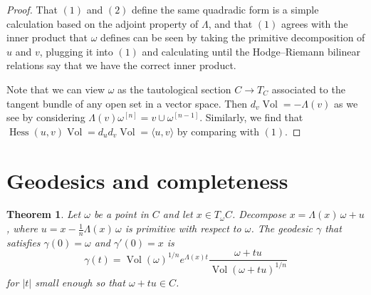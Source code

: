 \documentclass[11pt,a4paper]{amsart}
\newtheorem{theo}{Theorem}[section]
\theoremstyle{definition}
\theoremstyle{remark}
\newcommand{\Vol}{\mathop{\mathrm{Vol}}}
\def\kf{\omega}
\def\Lef{\Lambda}
\def\ton{u}
\def\ttw{v}
\def\^#1{^{[#1]}}
\begin{document}
\begin{proof}
That $(1)$ and $(2)$ define the same quadradic form is a simple
calculation based on the adjoint property of $\Lef$, and that $(1)$
agrees with the inner product that $\kf$ defines can be seen by taking
the primitive decomposition of $\ton$ and $\ttw$, plugging it into $(1)$
and calculating until the Hodge--Riemann bilinear relations say that we
have the correct inner product.

Note that we can view $\kf$ as the tautological section $C \to T_C$
associated to the tangent bundle of any open set in a vector space.
Then $d_{\ttw} \Vol = -\Lef(\ttw)$ as we see by considering
$\Lef(\ttw) \kf\^n = \ttw \cup \kf\^{n-1}$. Similarly, we find that
$\operatorname{Hess}(\ton,\ttw) \Vol 
= d_{\ton} d_{\ttw}\Vol = \langle \ton, \ttw \rangle$ by comparing with
$(1)$.
\end{proof}





\section{Geodesics and completeness}


\begin{theo}
\label{theo:geodesics}
Let $\kf$ be a point in $C$ and let $x \in T_{\kf} C$. Decompose $x =
\Lef(x) \, \kf + u$, where $u = x - \frac{1}{n}\Lef(x)\,\kf$ is
primitive with respect to $\kf$.  The geodesic $\gamma$ that satisfies
$\gamma(0) = \kf$ and $\gamma'(0) = x$ is
$$
\gamma(t)
= \Vol(\kf)^{1/n} e^{\Lef(x)t} \frac{\kf + t u}{\Vol(\kf + t u)^{1/n}}
$$
for $|t|$ small enough so that $\kf + tu \in C$.
\end{theo}
\end{document}
